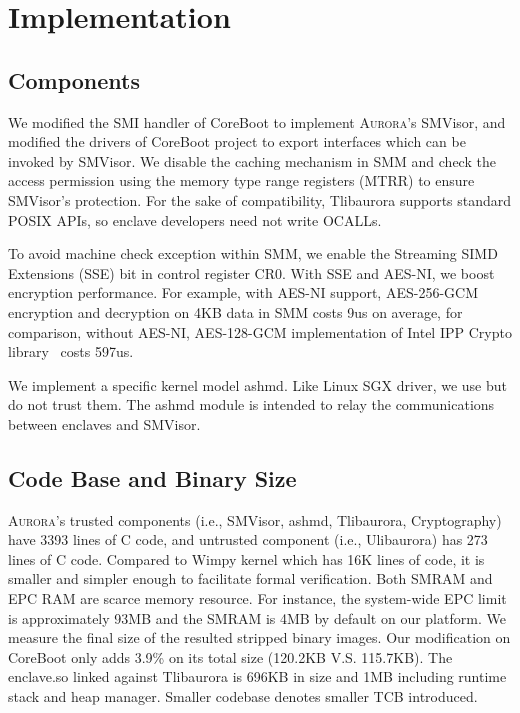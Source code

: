 \section{Implementation}

\subsection{Components}

We modified the SMI handler of CoreBoot to implement \textsc{Aurora}'s SMVisor, and modified the drivers of CoreBoot project to export interfaces which can be invoked by SMVisor. We disable the caching mechanism in SMM and check the access permission using the memory type range registers (MTRR) to ensure SMVisor's protection. For the sake of compatibility, Tlibaurora supports standard
POSIX APIs, so enclave developers need not write OCALLs.

To avoid machine check exception within SMM, we enable the Streaming SIMD Extensions (SSE) bit in control register CR0. With SSE and AES-NI, we boost encryption performance. For example, with AES-NI support, AES-256-GCM encryption and decryption on 4KB data in SMM costs 9us on average, for comparison,  without AES-NI, AES-128-GCM implementation of Intel IPP Crypto library~\cite{Intel_IPP_2017_Update_2} costs 597us.

We implement a specific kernel model ashmd. Like Linux SGX driver, we use but do not trust them. The ashmd module is intended to relay the communications between enclaves and SMVisor.

\subsection{Code Base and Binary Size}\label{codebase}
\textsc{Aurora}'s trusted components (i.e., SMVisor, ashmd, Tlibaurora, Cryptography) have 3393 lines of C code, and untrusted component (i.e., Ulibaurora) has 273 lines of C code. Compared to Wimpy kernel \cite{zhou_dancing_2014} which has 16K lines of code, it is smaller and simpler enough to facilitate formal verification.
Both SMRAM and EPC RAM are scarce memory resource. For instance, the system-wide EPC limit is approximately 93MB and the SMRAM is 4MB by default on our platform. We measure the final size of the resulted stripped binary images. Our modification on CoreBoot only adds 3.9\% on its total size (120.2KB V.S. 115.7KB). The enclave.so  linked against Tlibaurora is 696KB in size and 1MB including runtime stack and heap manager. Smaller codebase denotes smaller TCB introduced.

